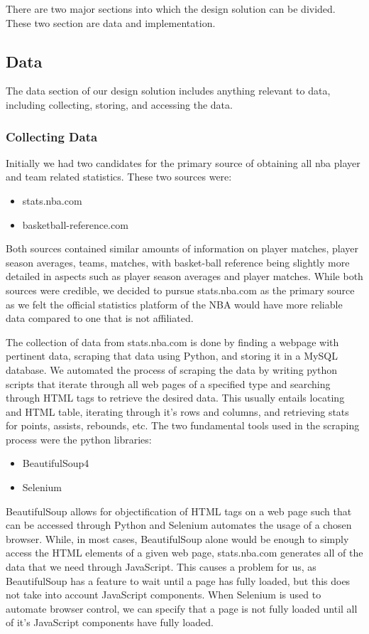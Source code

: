 There are two major sections into which the design solution can be divided. These two section are data and implementation. 

\subsection{Data}

The data section of our design solution includes anything relevant to data, including collecting, storing, and accessing the data.
\subsubsection{Collecting Data}
Initially we had two candidates for the primary source of obtaining all nba player and team related statistics. These two sources were: 
\begin{itemize}
\item stats.nba.com
\item basketball-reference.com
\end{itemize}
Both sources contained similar amounts of information on player matches, player season averages, teams, matches, with basket-ball reference being slightly more detailed in aspects such as player season averages and player matches. While both sources were credible, we decided to pursue stats.nba.com as the primary source as we felt the official statistics platform of the NBA would have more reliable data compared to one that is not affiliated.

The collection of data from stats.nba.com is done by finding a webpage with pertinent data, scraping that data using Python, and storing it in a MySQL database. We automated the process of scraping the data by writing python scripts that iterate through all web pages of a specified type and searching through HTML tags to retrieve the desired data. This usually entails locating and HTML table, iterating through it's rows and columns, and retrieving stats for points, assists, rebounds, etc. The two fundamental tools used in the scraping process were the python libraries:
\begin{itemize}
\item BeautifulSoup4
\item Selenium
\end{itemize}

BeautifulSoup allows for objectification of HTML tags on a web page such that can be accessed  through Python and Selenium automates the usage of a chosen browser. While, in most cases, BeautifulSoup alone would be enough to simply access the HTML elements of a given web page, stats.nba.com generates all of the data that we need through JavaScript. This causes a problem for us, as BeautifulSoup has a feature to wait until a page has fully loaded, but this does not take into account JavaScript components. When Selenium is used to automate browser control, we can specify that a page is not fully loaded until all of it's JavaScript components have fully loaded.



